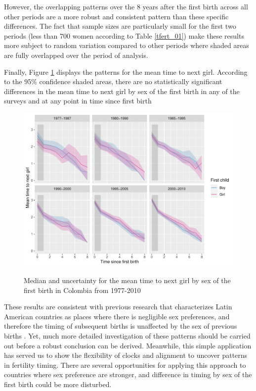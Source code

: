 \documentclass[a4paper,left=1.25cm,right=1.25cm,top=1.25cm,bottom=1.25cm]{article}
\begin{document}
However, the overlapping patterns over the 8 years after the first birth across all other periods are a more robust and consistent pattern than these specific differences. The fact that sample sizes are particularly small for the first two periods (less than 700 women according to Table \ref{tfert_01}) make these results more subject to random variation compared to other periods where shaded areas are fully overlapped over the period of analysis.

Finally,  Figure \ref{fert_03} displays the patterns for the mean time to next girl. According to the 95\% confidence shaded areas, there are no statistically significant differences in the mean time to next girl by sex of the first birth in any of the surveys and at any point in time since first birth

\begin{figure}[H]
\centering
    \includegraphics[scale=0.8]{Spells/Figures/colombia/colombia_period_new_3.pdf}\\
    \caption{Median and uncertainty for the mean time to next girl by sex of the first birth in Colombia from 1977-2010}
        \label{fert_03}
\end{figure}

These results are consistent with previous research that characterizes Latin American countries as places where there is negligible sex preferences, and therefore the timing of subsequent births is unaffected by the sex of previous births \cite{filmer2008}. Yet, much more detailed investigation of these patterns should be carried out before a robust conclusion can be derived. Meanwhile, this simple application has served us to show the flexibility of clocks and alignment to uncover patterns in fertility timing. There are several opportunities for applying this approach to countries where sex preference are stronger, and difference in timing by sex of the first birth could be more disturbed.
\end{document}
